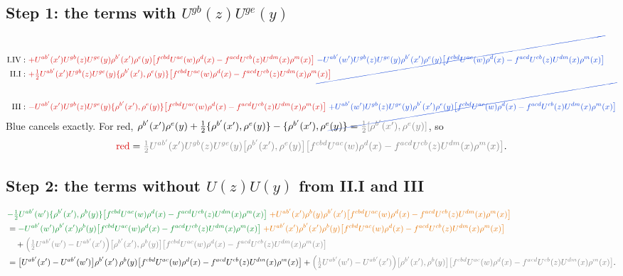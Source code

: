 \documentclass[10pt]{article}
\newcommand{\R}[1]{{\color{cR}#1}}
\newcommand{\B}[1]{{\color{cB}#1}}
\newcommand{\G}[1]{{\color{cG}#1}}
\newcommand{\Or}[1]{{\color{cO}#1}}
\newcommand{\Gr}[1]{{\color{cX}#1}}
\begin{document}
\subsection*{Step 1: the terms with $U^{gb}(z)U^{ge}(y)$}
\begin{align}
\text{I.IV}:\ &\R{+U^{ab'}(x')U^{gb}(z)U^{ge}(y)\rho^{b'}(x')\rho^{e}(y)\big[f^{cbd}U^{ac}(w)\rho^{d}(x)-f^{acd}U^{cb}(z)U^{dm}(x)\rho^{m}(x)\big]}\;\B{\cancel{-U^{ab'}(w')U^{gb}(z)U^{ge}(y)\rho^{b'}(x')\rho^{e}(y)\big[f^{cbd}U^{ac}(w)\rho^{d}(x)-f^{acd}U^{cb}(z)U^{dm}(x)\rho^{m}(x)\big]}}\notag\\
\text{II.I}:\ &\R{+\tfrac12U^{ab'}(x')U^{gb}(z)U^{ge}(y)\{\rho^{b'}(x'),\rho^{e}(y)\}\big[f^{cbd}U^{ac}(w)\rho^{d}(x)-f^{acd}U^{cb}(z)U^{dm}(x)\rho^{m}(x)\big]}\notag\\
\text{III}:\ &\R{-U^{ab'}(x')U^{gb}(z)U^{ge}(y)\{\rho^{b'}(x'),\rho^{e}(y)\}\big[f^{cbd}U^{ac}(w)\rho^{d}(x)-f^{acd}U^{cb}(z)U^{dm}(x)\rho^{m}(x)\big]}\;\B{\cancel{+U^{ab'}(w')U^{gb}(z)U^{ge}(y)\rho^{b'}(x')\rho^{e}(y)\big[f^{cbd}U^{ac}(w)\rho^{d}(x)-f^{acd}U^{cb}(z)U^{dm}(x)\rho^{m}(x)\big]}}
\end{align}
\B{Blue} cancels exactly. For \R{red}, $\rho^{b'}(x')\rho^{e}(y)+\tfrac12\{\rho^{b'}(x'),\rho^{e}(y)\}-\{\rho^{b'}(x'),\rho^{e}(y)\}=\Gr{\tfrac12[\rho^{b'}(x'),\rho^{e}(y)]}$, so
\begin{equation}
\R{\text{red}}=\Gr{\tfrac12U^{ab'}(x')U^{gb}(z)U^{ge}(y)\big[\rho^{b'}(x'),\rho^{e}(y)\big]\big[f^{cbd}U^{ac}(w)\rho^{d}(x)-f^{acd}U^{cb}(z)U^{dm}(x)\rho^{m}(x)\big]}.
\end{equation}

\subsection*{Step 2: the terms without $U(z)U(y)$ from II.I and III}
\begin{align}
&\G{-\tfrac12U^{ab'}(w')\{\rho^{b'}(x'),\rho^{b}(y)\}\big[f^{cbd}U^{ac}(w)\rho^{d}(x)-f^{acd}U^{cb}(z)U^{dm}(x)\rho^{m}(x)\big]}\;\Or{+U^{ab'}(x')\rho^{b}(y)\rho^{b'}(x')\big[f^{cbd}U^{ac}(w)\rho^{d}(x)-f^{acd}U^{cb}(z)U^{dm}(x)\rho^{m}(x)\big]}\notag\\
&=\G{-U^{ab'}(w')\rho^{b'}(x')\rho^{b}(y)\big[f^{cbd}U^{ac}(w)\rho^{d}(x)-f^{acd}U^{cb}(z)U^{dm}(x)\rho^{m}(x)\big]}\;\Or{+U^{ab'}(x')\rho^{b'}(x')\rho^{b}(y)\big[f^{cbd}U^{ac}(w)\rho^{d}(x)-f^{acd}U^{cb}(z)U^{dm}(x)\rho^{m}(x)\big]}\notag\\
&\quad+\Gr{\Big(\tfrac12U^{ab'}(w')-U^{ab'}(x')\Big)\big[\rho^{b'}(x'),\rho^{b}(y)\big]\big[f^{cbd}U^{ac}(w)\rho^{d}(x)-f^{acd}U^{cb}(z)U^{dm}(x)\rho^{m}(x)\big]}\notag\\
&=\big[U^{ab'}(x')-U^{ab'}(w')\big]\rho^{b'}(x')\,\rho^{b}(y)\big[f^{cbd}U^{ac}(w)\rho^{d}(x)-f^{acd}U^{cb}(z)U^{dm}(x)\rho^{m}(x)\big]+\Gr{\Big(\tfrac12U^{ab'}(w')-U^{ab'}(x')\Big)\big[\rho^{b'}(x'),\rho^{b}(y)\big]\big[f^{cbd}U^{ac}(w)\rho^{d}(x)-f^{acd}U^{cb}(z)U^{dm}(x)\rho^{m}(x)\big]}.
\end{align}
\end{document}
